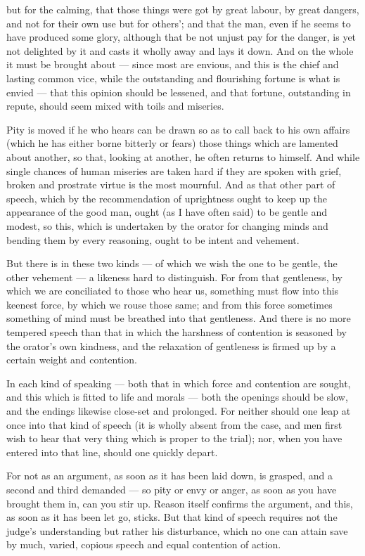  but for the calming, that those things were got by great labour, by great dangers, and not for their own use but for others'; and that the man, even if he seems to have produced some glory, although that be not unjust pay for the danger, is yet not delighted by it and casts it wholly away and lays it down. And on the whole it must be brought about — since most are envious, and this is the chief and lasting common vice, while the outstanding and flourishing fortune is what is envied — that this opinion should be lessened, and that fortune, outstanding in repute, should seem mixed with toils and miseries.

 Pity is moved if he who hears can be drawn so as to call back to his own affairs (which he has either borne bitterly or fears) those things which are lamented about another, so that, looking at another, he often returns to himself. And while single chances of human miseries are taken hard if they are spoken with grief, broken and prostrate virtue is the most mournful. And as that other part of speech, which by the recommendation of uprightness ought to keep up the appearance of the good man, ought (as I have often said) to be gentle and modest, so this, which is undertaken by the orator for changing minds and bending them by every reasoning, ought to be intent and vehement.

 But there is in these two kinds — of which we wish the one to be gentle, the other vehement — a likeness hard to distinguish. For from that gentleness, by which we are conciliated to those who hear us, something must flow into this keenest force, by which we rouse those same; and from this force sometimes something of mind must be breathed into that gentleness. And there is no more tempered speech than that in which the harshness of contention is seasoned by the orator's own kindness, and the relaxation of gentleness is firmed up by a certain weight and contention.

 In each kind of speaking — both that in which force and contention are sought, and this which is fitted to life and morals — both the openings should be slow, and the endings likewise close-set and prolonged. For neither should one leap at once into that kind of speech (it is wholly absent from the case, and men first wish to hear that very thing which is proper to the trial); nor, when you have entered into that line, should one quickly depart.

 For not as an argument, as soon as it has been laid down, is grasped, and a second and third demanded — so pity or envy or anger, as soon as you have brought them in, can you stir up. Reason itself confirms the argument, and this, as soon as it has been let go, sticks. But that kind of speech requires not the judge's understanding but rather his disturbance, which no one can attain save by much, varied, copious speech and equal contention of action.

